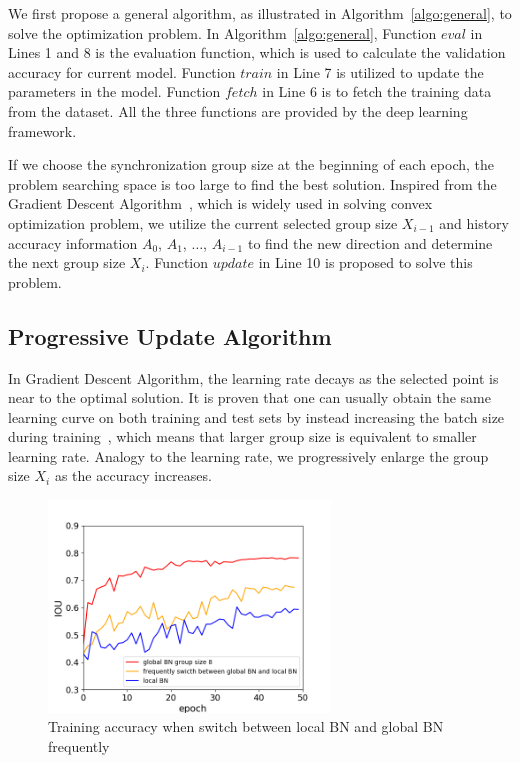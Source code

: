 \documentclass{llncs}
\begin{document}
We first propose a general algorithm, as illustrated in Algorithm~\ref{algo:general}, to solve the optimization problem. In Algorithm~\ref{algo:general}, Function $eval$ in Lines 1 and 8 is the evaluation function, which is used to calculate the validation accuracy for current model. Function $train$ in Line 7 is utilized to update the parameters in the model. Function $fetch$ in Line 6 is to fetch the training data from the dataset. All the three functions are provided by the deep learning framework.

If we choose the synchronization group size at the beginning of each epoch, the problem searching space is too large to find the best solution. Inspired from the Gradient Descent Algorithm~\cite{sgd}, which is widely used in solving convex optimization problem, we utilize the current selected group size $X_{i-1}$ and history accuracy information $A_0$, $A_1$, $\dots$, $A_{i-1}$ to find the new direction and determine the next group size $X_i$. Function $update$ in Line 10 is proposed to solve this problem.



\subsection{Progressive Update Algorithm}

In Gradient Descent Algorithm, the learning rate decays as the selected point is near to the optimal solution. It is proven that one can usually obtain the same learning curve on both training and test sets by instead increasing the batch size during training~\cite{decay-learning-rate}, which means that larger group size is equivalent to smaller learning rate. Analogy to the learning rate, we progressively enlarge the group size $X_i$ as the accuracy increases.

\begin{figure}
    \centering
    \includegraphics[width=7.5cm]{figure/switch-frequently.png}
    \caption{Training accuracy when switch between local BN and global BN frequently}
    \label{fig:switch-frequently}
\end{figure}
\end{document}
